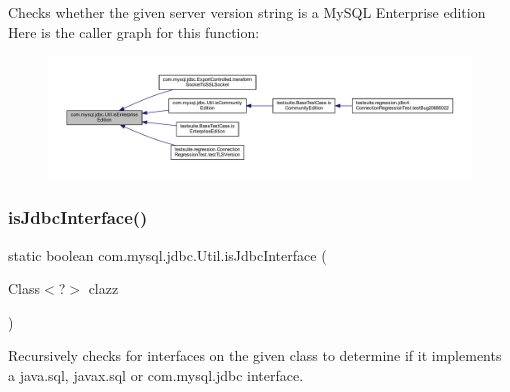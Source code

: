 Checks whether the given server version string is a My\+S\+QL Enterprise edition Here is the caller graph for this function\+:
\nopagebreak
\begin{figure}[H]
\begin{center}
\leavevmode
\includegraphics[width=350pt]{classcom_1_1mysql_1_1jdbc_1_1_util_a0baaeeb5b7526fe807869f6941b77a27_icgraph}
\end{center}
\end{figure}
\mbox{\label{classcom_1_1mysql_1_1jdbc_1_1_util_ad3d011a699b9fccde5f515f9fbd5b5f3}} 
\subsubsection{\texorpdfstring{is\+Jdbc\+Interface()}{isJdbcInterface()}}
{\footnotesize\ttfamily static boolean com.\+mysql.\+jdbc.\+Util.\+is\+Jdbc\+Interface (\begin{DoxyParamCaption}\item[{Class$<$?$>$}]{clazz }\end{DoxyParamCaption})\hspace{0.3cm}{\ttfamily [static]}}

Recursively checks for interfaces on the given class to determine if it implements a java.\+sql, javax.\+sql or com.\+mysql.\+jdbc interface.


